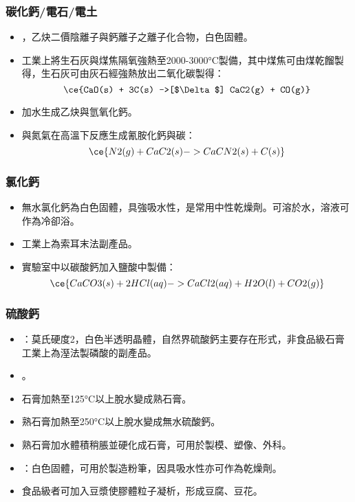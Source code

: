 \documentclass[a4paper,12pt]{report}
\begin{document}
\begin{itemize}
\begin{itemize}
\subsubsection{碳化鈣/電石/電土}
\begin{itemize}
\item {}，乙炔二價陰離子與鈣離子之離子化合物，白色固體。
\item 工業上將生石灰與煤焦隔氧強熱至2000-3000°C製備，其中煤焦可由煤乾餾製得，生石灰可由灰石經強熱放出二氧化碳製得：
\[\ce{CaO(s) + 3C(s) ->[$\Delta$] CaC2(g) + CO(g)}\]
\item 加水生成乙炔與氫氧化鈣。
\item 與氮氣在高溫下反應生成氰胺化鈣與碳：
\[\ce{N2(g) + CaC2(s) -> CaCN2(s) + C(s)}\]
\end{itemize}
\subsubsection{氯化鈣}
\begin{itemize}
\item 無水氯化鈣為白色固體，具強吸水性，是常用中性乾燥劑。可溶於水，溶液可作為冷卻浴。
\item 工業上為索耳末法副產品。
\item 實驗室中以碳酸鈣加入鹽酸中製備：
\[\ce{CaCO3(s) + 2HCl(aq) -> CaCl2(aq) + H2O(l) + CO2(g)}\]
\end{itemize}
\subsubsection{硫酸鈣}
\begin{itemize}
\item {}：莫氏硬度2，白色半透明晶體，自然界硫酸鈣主要存在形式，非食品級石膏工業上為溼法製磷酸的副產品。
\item {}。
\item 石膏加熱至125°C以上脫水變成熟石膏。
\item 熟石膏加熱至250°C以上脫水變成無水硫酸鈣。
\item 熟石膏加水體積稍脹並硬化成石膏，可用於製模、塑像、外科。
\item {}：白色固體，可用於製造粉筆，因具吸水性亦可作為乾燥劑。
\item 食品級者可加入豆漿使膠體粒子凝析，形成豆腐、豆花。
\end{itemize}

\end{itemize}
\end{itemize}
\end{document}
